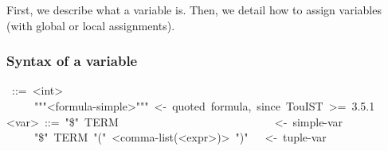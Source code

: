 \noindent First, we describe what a variable is. Then, we detail how to assign
variables (with global or local assignments).%

\subsubsection{Syntax of a variable}\label{sec-syntax-of-a-variable}%
\begin{mdpre}%
~::=~{\textless{}int\textgreater{}}\\
~~~~\textbar{}~"""{\textless{}formula-simple\textgreater{}}"""~{\textless{}-~quoted~formula,~since~TouIST~\textgreater{}=~3.5.1}\\
{\textless{}var\textgreater{}}~::=~"\$"~TERM~~~~~~~~~~~~~~~~~~~~~~~~~~~~{\textless{}-~simple-var}\\
~~~~\textbar{}~"\$"~TERM~"("~{\textless{}comma-list(\textless{}expr\textgreater{})\textgreater{}}~")"~~~{\textless{}-~tuple-var}%
\end{mdpre}

